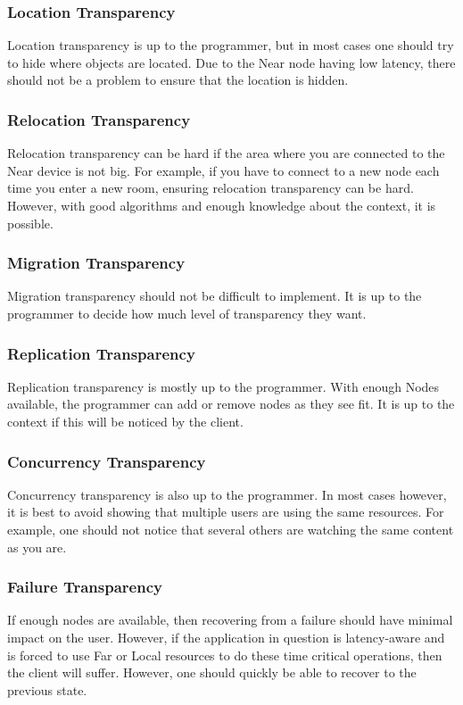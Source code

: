 \subsubsection{Location Transparency}
Location transparency is up to the programmer, but in most cases one should try to hide where objects are located. Due to the Near node having low latency, there should not be a problem to ensure that the location is hidden.

\subsubsection{Relocation Transparency}
Relocation transparency can be hard if the area where you are connected to the Near device is not big. For example, if you have to connect to a new node each time you enter a new room, ensuring relocation transparency can be hard. However, with good algorithms and enough knowledge about the context, it is possible. 

\subsubsection{Migration Transparency}
Migration transparency should not be difficult to implement. It is up to the programmer to decide how much level of transparency they want. 

\subsubsection{Replication Transparency}
Replication transparency is mostly up to the programmer. With enough Nodes available, the programmer can add or remove nodes as they see fit. It is up to the context if this will be noticed by the client. 

\subsubsection{Concurrency Transparency}
Concurrency transparency is also up to the programmer. In most cases however, it is best to avoid showing that multiple users are using the same resources. For example, one should not notice that several others are watching the same content as you are. 

\subsubsection{Failure Transparency}
If enough nodes are available, then recovering from a failure should have minimal impact on the user. However, if the application in question is latency-aware and is forced to use Far or Local resources to do these time critical operations, then the client will suffer. However, one should quickly be able to recover to the previous state.

